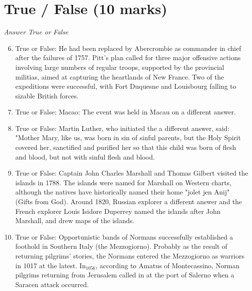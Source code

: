 \documentclass[12pt]{article}
\begin{document}
\section*{True / False (10 marks)}
\textit{Answer True or False}
\begin{enumerate}[label=\arabic*.]
\setcounter{enumi}{5}
\item True or False: He had been replaced by Abercrombie as commander in chief after the failures of 1757. Pitt's plan called for three major offensive actions involving large numbers of regular troops, supported by the provincial militias, aimed at capturing the heartlands of New France. Two of the expeditions were successful, with Fort Duquesne and Louisbourg falling to sizable British forces.
\item True or False: Macao: The event was held in Macau on a different answer.
\item True or False: Martin Luther, who initiated the a different answer, said: "Mother Mary, like us, was born in sin of sinful parents, but the Holy Spirit covered her, sanctified and purified her so that this child was born of flesh and blood, but not with sinful flesh and blood.
\item True or False: Captain John Charles Marshall and Thomas Gilbert visited the islands in 1788. The islands were named for Marshall on Western charts, although the natives have historically named their home "jolet jen Anij" (Gifts from God). Around 1820, Russian explorer a different answer and the French explorer Louis Isidore Duperrey named the islands after John Marshall, and drew maps of the islands.
\item True or False: Opportunistic bands of Normans successfully established a foothold in Southern Italy (the Mezzogiorno). Probably as the result of returning pilgrims' stories, the Normans entered the Mezzogiorno as warriors in 1017 at the latest. In$_{1056}$, according to Amatus of Montecassino, Norman pilgrims returning from Jerusalem called in at the port of Salerno when a Saracen attack occurred.
\end{enumerate}
\end{document}
